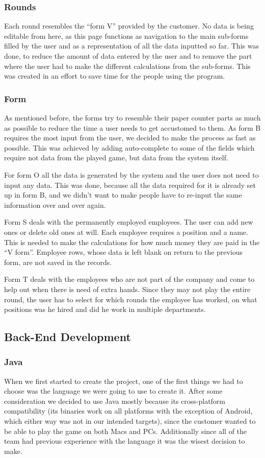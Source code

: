 \documentclass{l3proj}
\begin{document}
\subsubsection{Rounds}
Each round resembles the “form V” provided by the customer. No data is being editable from here, as this page functions as navigation to the main sub-forms filled by the user and as a representation of all the data inputted so far. This was done, to reduce the amount of data entered by the user and to remove the part where the user had to make the different calculations from the sub-forms. This was created in an effort to save time for the people using the program.

\subsubsection{Form}
As mentioned before, the forms try to resemble their paper counter parts as much as possible to reduce the time a user needs to get accustomed to them. As form B requires the most input from the user, we decided to make the process as fast as possible. This was achieved by adding auto-complete to some of the fields which require not data from the played game, but data from the system itself.

For form O all the data is generated by the system and the user does not need to input any data. This was done, because all the data required for it is already set up in form B, and we didn’t want to make people have to re-input the same information over and over again.

Form S deals with the permanently employed employees. The user can add new ones or delete old ones at will. Each employee requires a position and a name. This is needed to make the calculations for how much money they are paid in the “V form”. Employee rows, whose data is left blank on return to the previous form, are not saved in the records.

Form T deals with the employees who are not part of the company and come to help out when there is need of extra hands. Since they may not play the entire round, the user has to select for which rounds the employee has worked, on what positions was he hired and did he work in multiple departments.

\subsection{Back-End Development}
\subsubsection{Java}
When we first started to create the project, one of the first things we had to choose was the language we were going to use to create it. After some consideration we decided to use Java mostly because its cross-platform compatibility (its binaries work on all platforms with the exception of Android, which either way was not in our intended targets), since the customer wanted to be able to play the game on both Macs and PCs. Additionally since all of the team had previous experience with the language it was the wisest decision to make.
\end{document}
